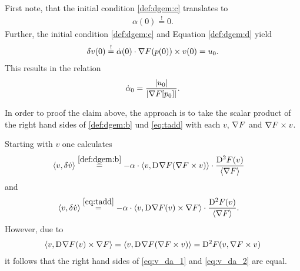 First note, that the initial condition \eqref{def:dgem:c} translates to
\begin{align}
    \alpha( 0 )  \overset{!}{=}  0 .
\end{align}
Further, the initial condition \eqref{def:dgem:c}
and Equation \eqref{def:dgem:d} yield
\begin{align}
    \delta v( 0 )   \overset{!}{=}
    \dot{ \alpha }( 0 ) \cdot \nabla F( p( 0 ) ) \times v( 0 )  =  u_0 .
\end{align}
This results in the relation
\begin{align}
    \dot{ \alpha }_0   =
    \frac{ \lvert  u_0  \rvert }{ \lvert  \nabla F[ p_0 ]  \rvert } .
\end{align}


In order to proof the claim above,
the approach is to take the scalar product
of the right hand sides of \eqref{def:dgem:b} und \eqref{eq:tadd}
with each $ v $, $ \nabla F $ and $ \nabla F \times v $.


Starting with $ v $ one calculates
\begin{align}
    \langle  v ,  \delta \dot{ v }  \rangle  &\overset{\eqref{def:dgem:b}}{=}
    -\alpha \cdot \langle  v ,  \mathrm{D}^{  }\nabla F( \nabla F \times v )  \rangle  \cdot
    \frac{ \mathrm{D}^{ 2 }F( v ) }{ \langle  \nabla F  \rangle }
    \label{eq:v_da_1}
\end{align}
and
\begin{align}
    \langle  v ,  \delta \dot{ v }  \rangle  &\overset{\eqref{eq:tadd}}{=}
    -\alpha \cdot \langle  v ,  \mathrm{D}^{  }\nabla F( v ) \times \nabla F  \rangle  \cdot
    \frac{ \mathrm{D}^{ 2 }F( v ) }{ \langle  \nabla F   \rangle } .
    \label{eq:v_da_2}
\end{align}
However, due to
\begin{align}
    \langle  v ,  \mathrm{D}^{  }\nabla F( v ) \times \nabla F  \rangle  =
    \langle  v ,  \mathrm{D}^{  }\nabla F( \nabla F \times v )  \rangle  =
    \mathrm{D}^{ 2 }F( v, \nabla F \times v )
\end{align}
it follows that the right hand sides
of \eqref{eq:v_da_1} and \eqref{eq:v_da_2} are equal.



